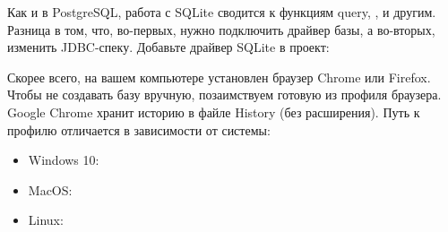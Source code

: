 Как и в PostgreSQL, работа с SQLite сводится к функциям query, ,  и другим. Разница в том, что, во-первых, нужно подключить драйвер базы, а во-вторых, изменить JDBC-спеку. Добавьте драйвер SQLite в проект:

\begin{english}
  \begin{clojure}
  \end{clojure}
\end{english}

Скорее всего, на вашем компьютере установлен браузер Chrome или Firefox. Чтобы не создавать базу вручную, позаимствуем готовую из профиля браузера. Google Chrome хранит историю в файле History (без расширения). Путь к профилю отличается в зависимости от системы:

\begin{itemize}

\item
  Windows 10: 

\item
  MacOS: 

\item
 Linux: 

\end{itemize}






